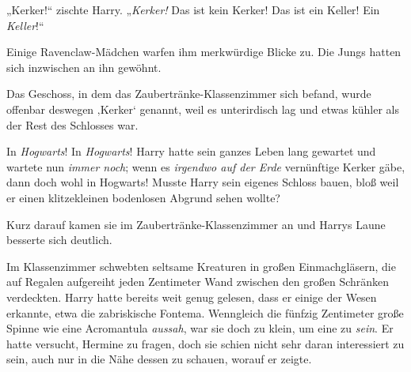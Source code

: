 „Kerker!“ zischte Harry.
„\emph{Kerker!} Das ist kein Kerker! Das ist ein Keller! Ein \emph{Keller}!“

Einige Ravenclaw-Mädchen warfen ihm merkwürdige Blicke zu. Die Jungs hatten sich inzwischen an ihn gewöhnt.

Das Geschoss, in dem das Zaubertränke-Klassenzimmer sich befand, wurde offenbar deswegen ‚Kerker‘ genannt, weil es unterirdisch lag und etwas kühler als der Rest des Schlosses war.

In \emph{Hogwarts}! In \emph{Hogwarts}! Harry hatte sein ganzes Leben lang gewartet und wartete nun \emph{immer noch}; wenn es \emph{irgendwo auf der Erde} vernünftige Kerker gäbe, dann doch wohl in Hogwarts! Musste Harry sein eigenes Schloss bauen, bloß weil er einen klitzekleinen bodenlosen Abgrund sehen wollte?

Kurz darauf kamen sie im Zaubertränke-Klassenzimmer an und Harrys Laune besserte sich deutlich.

Im Klassenzimmer schwebten seltsame Kreaturen in großen Einmachgläsern, die auf Regalen aufgereiht jeden Zentimeter Wand zwischen den großen Schränken verdeckten. Harry hatte bereits weit genug gelesen, dass er einige der Wesen erkannte, etwa die zabriskische Fontema. Wenngleich die fünfzig Zentimeter große Spinne wie eine Acromantula \emph{aussah}, war sie doch zu klein, um eine zu \emph{sein}. Er hatte versucht, Hermine zu fragen, doch sie schien nicht sehr daran interessiert zu sein, auch nur in die Nähe dessen zu schauen, worauf er zeigte.

